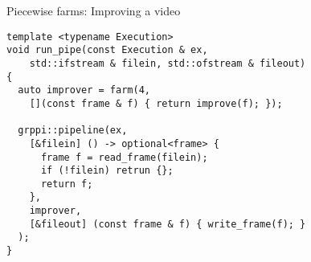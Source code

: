 \begin{frame}[t,fragile]{Piecewise farms: Improving a video}
\vspace{-1.25em}
\begin{lstlisting}
template <typename Execution>
void run_pipe(const Execution & ex, 
    std::ifstream & filein, std::ofstream & fileout)
{
  auto improver = farm(4, 
    [](const frame & f) { return improve(f); });

  grppi::pipeline(ex,
    [&filein] () -> optional<frame> {
      frame f = read_frame(filein);
      if (!filein) retrun {};
      return f;
    },
    improver,
    [&fileout] (const frame & f) { write_frame(f); }
  );
}
\end{lstlisting}
\end{frame}
